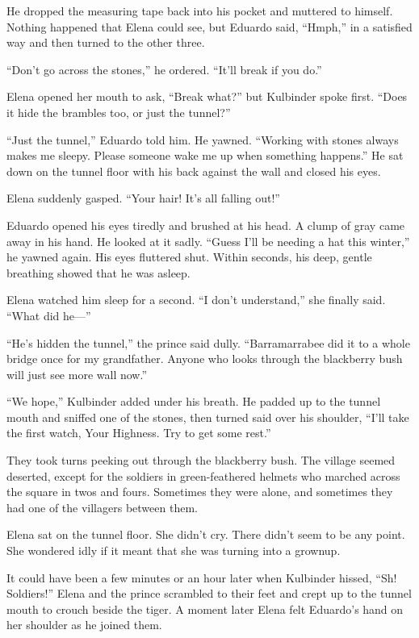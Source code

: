 \documentclass[10pt]{book}
\begin{document}
He dropped the measuring tape back into his pocket and muttered to himself. Nothing happened that Elena could see, but Eduardo said, ``Hmph,'' in a satisfied way and then turned to the other three.

``Don't go across the stones,'' he ordered. ``It'll break if you do.''

Elena opened her mouth to ask, ``Break what?'' but Kulbinder spoke first. ``Does it hide the brambles too, or just the tunnel?''

``Just the tunnel,'' Eduardo told him. He yawned. ``Working with stones always makes me sleepy. Please someone wake me up when something happens.'' He sat down on the tunnel floor with his back against the wall and closed his eyes.

Elena suddenly gasped. ``Your hair! It's all falling out!''

Eduardo opened his eyes tiredly and brushed at his head. A clump of gray came away in his hand. He looked at it sadly. ``Guess I'll be needing a hat this winter,'' he yawned again. His eyes fluttered shut. Within seconds, his deep, gentle breathing showed that he was asleep.

Elena watched him sleep for a second. ``I don't understand,'' she finally said. ``What did he---''

``He's hidden the tunnel,'' the prince said dully. ``Barramarrabee did it to a whole bridge once for my grandfather. Anyone who looks through the blackberry bush will just see more wall now.''

``We hope,'' Kulbinder added under his breath. He padded up to the tunnel mouth and sniffed one of the stones, then turned said over his shoulder, ``I'll take the first watch, Your Highness. Try to get some rest.''

They took turns peeking out through the blackberry bush. The village seemed deserted, except for the soldiers in green-feathered helmets who marched across the square in twos and fours. Sometimes they were alone, and sometimes they had one of the villagers between them.

Elena sat on the tunnel floor. She didn't cry. There didn't seem to be any point. She wondered idly if it meant that she was turning into a grownup.

It could have been a few minutes or an hour later when Kulbinder hissed, ``Sh! Soldiers!'' Elena and the prince scrambled to their feet and crept up to the tunnel mouth to crouch beside the tiger. A moment later Elena felt Eduardo's hand on her shoulder as he joined them.
\end{document}
